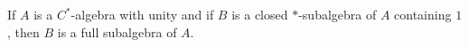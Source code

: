 If $A$ is a $C^*$-algebra with unity and if $B$ is a closed $*$-subalgebra of $A$ containing $1$, then $B$ is a full subalgebra of $A$.
